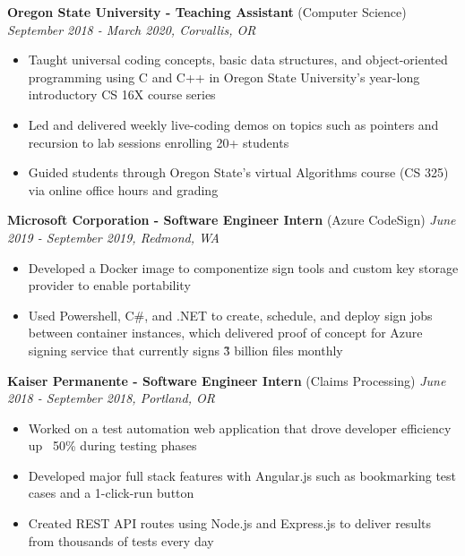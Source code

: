 \documentclass{article}
\begin{document}
\vskip 0.1in

\noindent \normalsize \textbf{Oregon State University - Teaching Assistant} \footnotesize (Computer Science) \hfill \small \textit{September 2018 - March 2020, Corvallis, OR}
\begin{itemize}
\item Taught universal coding concepts, basic data structures, and object-oriented programming using C and C++ in Oregon State University’s year-long introductory CS 16X course series
\item Led and delivered weekly live-coding demos on topics such as pointers and recursion to lab sessions enrolling 20+ students
\item Guided students through Oregon State's virtual Algorithms course (CS 325) via online office hours and grading
\end{itemize}

\vskip 0.1in

\noindent \normalsize \textbf{Microsoft Corporation - Software Engineer Intern} \footnotesize (Azure CodeSign) \hfill \small \textit{June 2019 - September 2019, Redmond, WA}
\begin{itemize}
\item Developed a Docker image to componentize sign tools and custom key storage provider to enable portability
\item Used Powershell, C#, and .NET to create, schedule, and deploy sign jobs between container instances, which delivered proof of concept for Azure signing service that currently signs \~3 billion files monthly
\end{itemize}

\vskip 0.1in

\noindent \normalsize \textbf{Kaiser Permanente - Software Engineer Intern} \footnotesize (Claims Processing) \hfill \small \textit{June 2018 - September 2018, Portland, OR}
\begin{itemize}
\item Worked on a test automation web application that drove developer efficiency up ~50\% during testing phases
\item Developed major full stack features with Angular.js such as bookmarking test cases and a 1-click-run button
\item Created REST API routes using Node.js and Express.js to deliver results from thousands of tests every day
\end{itemize}

\vskip 0.1in
\end{document}
